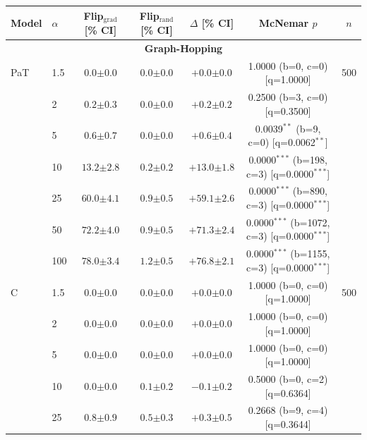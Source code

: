 \begin{table}[h!]
\centering
\tiny
\setlength{\tabcolsep}{4pt}
\begin{tabular}{l l cccc c}
\toprule
Model & $\alpha$ & Flip$_{\text{grad}}$ [\% CI] & Flip$_{\text{rand}}$ [\% CI] & $\Delta$ [\% CI] & McNemar $p$ & $n$ \\
\midrule
\multicolumn{7}{c}{\textbf{Graph-Hopping}} \\
\midrule
PaT & 1.5 & $0.0 {\scriptstyle \pm 0.0}$ & $0.0 {\scriptstyle \pm 0.0}$ & $+0.0 {\scriptstyle \pm 0.0}$ & 1.0000 (b=0, c=0) [q=1.0000] & 500 \\
 & 2 & $0.2 {\scriptstyle \pm 0.3}$ & $0.0 {\scriptstyle \pm 0.0}$ & $+0.2 {\scriptstyle \pm 0.2}$ & 0.2500 (b=3, c=0) [q=0.3500] &  \\
 & 5 & $0.6 {\scriptstyle \pm 0.7}$ & $0.0 {\scriptstyle \pm 0.0}$ & $+0.6 {\scriptstyle \pm 0.4}$ & 0.0039$^{**}$ (b=9, c=0) [q=0.0062$^{**}$] &  \\
 & 10 & $13.2 {\scriptstyle \pm 2.8}$ & $0.2 {\scriptstyle \pm 0.2}$ & $+13.0 {\scriptstyle \pm 1.8}$ & 0.0000$^{***}$ (b=198, c=3) [q=0.0000$^{***}$] &  \\
 & 25 & $60.0 {\scriptstyle \pm 4.1}$ & $0.9 {\scriptstyle \pm 0.5}$ & $+59.1 {\scriptstyle \pm 2.6}$ & 0.0000$^{***}$ (b=890, c=3) [q=0.0000$^{***}$] &  \\
 & 50 & $72.2 {\scriptstyle \pm 4.0}$ & $0.9 {\scriptstyle \pm 0.5}$ & $+71.3 {\scriptstyle \pm 2.4}$ & 0.0000$^{***}$ (b=1072, c=3) [q=0.0000$^{***}$] &  \\
 & 100 & $78.0 {\scriptstyle \pm 3.4}$ & $1.2 {\scriptstyle \pm 0.5}$ & $+76.8 {\scriptstyle \pm 2.1}$ & 0.0000$^{***}$ (b=1155, c=3) [q=0.0000$^{***}$] &  \\
\midrule
C & 1.5 & $0.0 {\scriptstyle \pm 0.0}$ & $0.0 {\scriptstyle \pm 0.0}$ & $+0.0 {\scriptstyle \pm 0.0}$ & 1.0000 (b=0, c=0) [q=1.0000] & 500 \\
 & 2 & $0.0 {\scriptstyle \pm 0.0}$ & $0.0 {\scriptstyle \pm 0.0}$ & $+0.0 {\scriptstyle \pm 0.0}$ & 1.0000 (b=0, c=0) [q=1.0000] &  \\
 & 5 & $0.0 {\scriptstyle \pm 0.0}$ & $0.0 {\scriptstyle \pm 0.0}$ & $+0.0 {\scriptstyle \pm 0.0}$ & 1.0000 (b=0, c=0) [q=1.0000] &  \\
 & 10 & $0.0 {\scriptstyle \pm 0.0}$ & $0.1 {\scriptstyle \pm 0.2}$ & $-0.1 {\scriptstyle \pm 0.2}$ & 0.5000 (b=0, c=2) [q=0.6364] &  \\
 & 25 & $0.8 {\scriptstyle \pm 0.9}$ & $0.5 {\scriptstyle \pm 0.3}$ & $+0.3 {\scriptstyle \pm 0.5}$ & 0.2668 (b=9, c=4) [q=0.3644] &  \\

\end{tabular}
\end{table}
